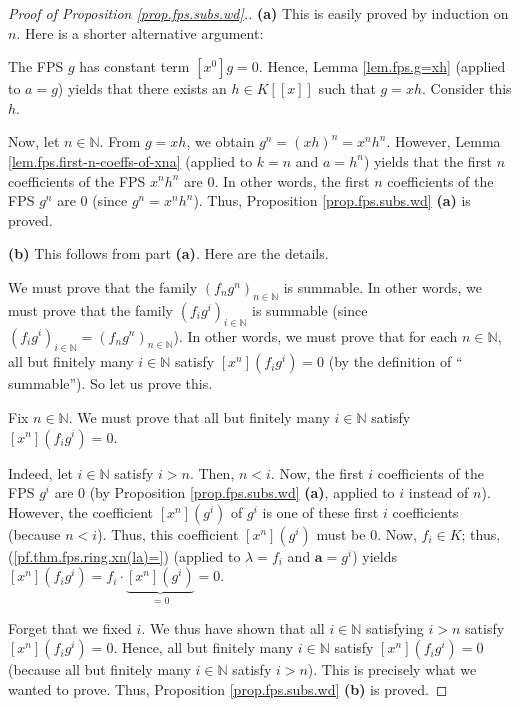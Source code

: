 \begin{proof}
[Proof of Proposition \ref{prop.fps.subs.wd}.]\textbf{(a)} This is easily
proved by induction on $n$. Here is a shorter alternative argument:

The FPS $g$ has constant term $\left[  x^{0}\right]  g=0$. Hence, Lemma
\ref{lem.fps.g=xh} (applied to $a=g$) yields that there exists an $h\in
K\left[  \left[  x\right]  \right]  $ such that $g=xh$. Consider this $h$.

Now, let $n\in\mathbb{N}$. From $g=xh$, we obtain $g^{n}=\left(  xh\right)
^{n}=x^{n}h^{n}$. However, Lemma \ref{lem.fps.first-n-coeffs-of-xna} (applied
to $k=n$ and $a=h^{n}$) yields that the first $n$ coefficients of the FPS
$x^{n}h^{n}$ are $0$. In other words, the first $n$ coefficients of the FPS
$g^{n}$ are $0$ (since $g^{n}=x^{n}h^{n}$). Thus, Proposition
\ref{prop.fps.subs.wd} \textbf{(a)} is proved. \medskip

\textbf{(b)} This follows from part \textbf{(a)}. Here are the details.

We must prove that the family $\left(  f_{n}g^{n}\right)  _{n\in\mathbb{N}}$
is summable. In other words, we must prove that the family $\left(  f_{i}%
g^{i}\right)  _{i\in\mathbb{N}}$ is summable (since $\left(  f_{i}%
g^{i}\right)  _{i\in\mathbb{N}}=\left(  f_{n}g^{n}\right)  _{n\in\mathbb{N}}%
$). In other words, we must prove that for each $n\in\mathbb{N}$, all but
finitely many $i\in\mathbb{N}$ satisfy $\left[  x^{n}\right]  \left(
f_{i}g^{i}\right)  =0$ (by the definition of \textquotedblleft
summable\textquotedblright). So let us prove this.

Fix $n\in\mathbb{N}$. We must prove that all but finitely many $i\in
\mathbb{N}$ satisfy $\left[  x^{n}\right]  \left(  f_{i}g^{i}\right)  =0$.

Indeed, let $i\in\mathbb{N}$ satisfy $i>n$. Then, $n<i$. Now, the first $i$
coefficients of the FPS $g^{i}$ are $0$ (by Proposition \ref{prop.fps.subs.wd}
\textbf{(a)}, applied to $i$ instead of $n$). However, the coefficient
$\left[  x^{n}\right]  \left(  g^{i}\right)  $ of $g^{i}$ is one of these
first $i$ coefficients (because $n<i$). Thus, this coefficient $\left[
x^{n}\right]  \left(  g^{i}\right)  $ must be $0$. Now, $f_{i}\in K$; thus,
(\ref{pf.thm.fps.ring.xn(la)=}) (applied to $\lambda=f_{i}$ and $\mathbf{a}%
=g^{i}$) yields $\left[  x^{n}\right]  \left(  f_{i}g^{i}\right)  =f_{i}%
\cdot\underbrace{\left[  x^{n}\right]  \left(  g^{i}\right)  }_{=0}=0$.

Forget that we fixed $i$. We thus have shown that all $i\in\mathbb{N}$
satisfying $i>n$ satisfy $\left[  x^{n}\right]  \left(  f_{i}g^{i}\right)
=0$. Hence, all but finitely many $i\in\mathbb{N}$ satisfy $\left[
x^{n}\right]  \left(  f_{i}g^{i}\right)  =0$ (because all but finitely many
$i\in\mathbb{N}$ satisfy $i>n$). This is precisely what we wanted to prove.
Thus, Proposition \ref{prop.fps.subs.wd} \textbf{(b)} is proved. \medskip


\end{proof}
